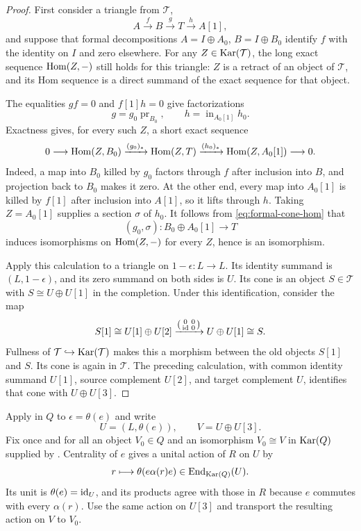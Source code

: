\begin{proof}
First consider a triangle from $\mathcal T$,
\[
  A\xrightarrow{f}B\xrightarrow{g}T\xrightarrow{h}A[1],
\]
and suppose that formal decompositions
$A=I\oplus A_0$, $B=I\oplus B_0$ identify $f$ with the identity
on $I$ and zero elsewhere.  For any $Z\in\operatorname{Kar}(\mathcal T)$,
the long exact sequence $\operatorname{Hom}(Z,-)$ still holds for this triangle:
$Z$ is a retract of an object of $\mathcal T$, and its Hom sequence
is a direct summand of the exact sequence for that object.

The equalities $gf=0$ and $f[1]h=0$ give factorizations
\[
  g=g_0\operatorname{pr}_{B_0},\qquad
  h=\operatorname{in}_{A_0[1]}h_0.
\]
Exactness gives, for every such $Z$, a short exact sequence
\begin{equation}\label{eq:formal-cone-hom}
  0\longrightarrow\operatorname{Hom}(Z,B_0)
   \xrightarrow{(g_0)_*}\operatorname{Hom}(Z,T)
   \xrightarrow{(h_0)_*}\operatorname{Hom}(Z,A_0[1])
   \longrightarrow0.
\end{equation}
Indeed, a map into $B_0$ killed by $g_0$ factors through $f$ after
inclusion into $B$, and projection back to $B_0$ makes it zero.
At the other end, every map into $A_0[1]$ is killed by $f[1]$ after
inclusion into $A[1]$, so it lifts through $h$.
Taking $Z=A_0[1]$ supplies a section $\sigma$ of $h_0$.
It follows from \eqref{eq:formal-cone-hom} that
\[
  (g_0,\sigma):B_0\oplus A_0[1]\longrightarrow T
\]
induces isomorphisms on $\operatorname{Hom}(Z,-)$ for every $Z$, hence is an
isomorphism.

Apply this calculation to a triangle on $1-\epsilon:L\to L$.
Its identity summand is $(L,1-\epsilon)$, and its zero summand on
both sides is $U$.  Its cone is an object $S\in\mathcal T$ with
$S\cong U\oplus U[1]$ in the completion.  Under this identification,
consider the map
\[
  S[1]\cong U[1]\oplus U[2]
     \xrightarrow{\left(\begin{smallmatrix}0&0\\\operatorname{id}&0\end{smallmatrix}\right)}
  U\oplus U[1]\cong S.
\]
Fullness of $\mathcal T\hookrightarrow\operatorname{Kar}(\mathcal T)$ makes
this a morphism between the old objects $S[1]$ and $S$.
Its cone is again in $\mathcal T$.
The preceding calculation, with common identity summand $U[1]$,
source complement $U[2]$, and target complement $U$, identifies
that cone with $U\oplus U[3]$.
\end{proof}

Apply  in $Q$ to $\epsilon=\theta(e)$ and write
\[
  U=(L,\theta(e)),\qquad V=U\oplus U[3].
\]
Fix once and for all an object $V_0\in Q$ and an isomorphism
$V_0\cong V$ in $\operatorname{Kar}(Q)$ supplied by .
Centrality of $e$ gives a unital action of $R$ on $U$ by
\[
  r\longmapsto\theta(e\alpha(r)e)\in\operatorname{End}_{\operatorname{Kar}(Q)}(U).
\]
Its unit is $\theta(e)=\operatorname{id}_U$, and its products agree with those
in $R$ because $e$ commutes with every $\alpha(r)$.
Use the same action on $U[3]$ and transport the resulting action
on $V$ to $V_0$.

